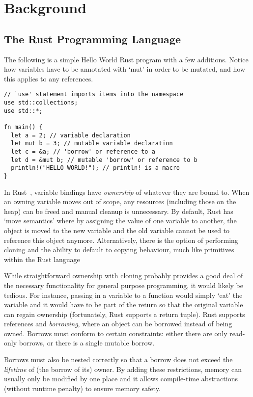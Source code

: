 \section{Background}\label{C:back} 

\subsection{The Rust Programming Language}

The following is a simple Hello World Rust program with a few additions. Notice how variables have to be annotated with `mut' in order to be mutated, and how this applies to any references.

\begin{verbatim}
// `use' statement imports items into the namespace
use std::collections;
use std::*;

fn main() {
  let a = 2; // variable declaration
  let mut b = 3; // mutable variable declaration
  let c = &a; // 'borrow' or reference to a
  let d = &mut b; // mutable 'borrow' or reference to b
  println!("HELLO WORLD!"); // println! is a macro
}
\end{verbatim}

In Rust~\cite{doc15}, variable bindings have \textit{ownership} of whatever they are bound to. When an owning variable moves out of scope, any resources (including those on the heap) can be freed and manual cleanup is unnecessary. By default, Rust has `move semantics' where by assigning the value of one variable to another, the object is moved to the new variable and the old variable cannot be used to reference this object anymore. Alternatively, there is the option of performing cloning and the ability to default to copying behaviour, much like primitives within the Rust language

While straightforward ownership with cloning probably provides a good deal of the necessary functionality for general purpose programming, it would likely be tedious. For instance, passing in a variable to a function would simply `eat' the variable and it would have to be part of the return so that the original variable can regain ownership (fortunately, Rust supports a return tuple). Rust supports references and \textit{borrowing}, where an object can be borrowed instead of being owned. Borrows must conform to certain constraints: either there are only read-only borrows, or there is a single mutable borrow.

Borrows must also be nested correctly so that a borrow does not exceed the \textit{lifetime} of (the borrow of its) owner. By adding these restrictions, memory can usually only be modified by one place and it allows compile-time abstractions (without runtime penalty) to ensure memory safety.

